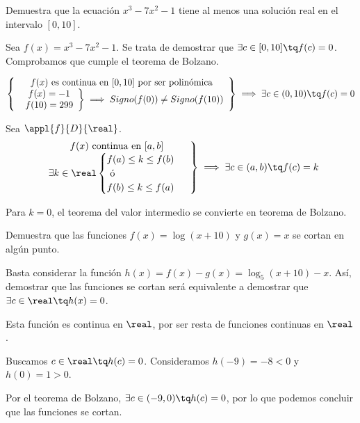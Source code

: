 \begin{problem} Demuestra que la ecuación $x^3-7x^2-1$ tiene al menos una solución real en el intervalo $[0,10]$.
\solution

Sea $f(x) = x^3-7x^2-1$. Se trata de demostrar que $\exists c\in[0,10]\tq f(c) = 0$. Comprobamos que cumple el teorema de Bolzano.

\[
\left\{
	\begin{array}{c}
		f(x) \text{ es continua en } [0,10] \text{ por ser polinómica}\\
		\left.\begin{array}{c}
		f(x) = -1 \\
		f(10) = 299\end{array}
		\right\}\implies Signo(f(0))\neq Signo(f(10))
	\end{array}
\right\}\implies \exists c\in(0,10)\tq f(c)=0 
\]
\end{problem}

\begin{theorem}
Sea $\appl{f}{D}{\real}$.
\[
\left.\begin{array}{c}f(x) \text{ continua en } [a,b]\\
\exists k\in\real \begin{cases}f(a)\leq k\leq f(b)\\ \text{           ó} \\f(b)\leq k \leq f(a)\end{cases}\end{array}\right\}\implies \exists c\in(a,b) \tq f(c) = k
\]
\end{theorem}

\obs Para $k=0$, el teorema del valor intermedio se convierte en teorema de Bolzano.


\begin{problem}
Demuestra que las funciones $f(x) = \log(x+10)$ y $g(x) = x$ se cortan en algún punto.
\solution

Basta considerar la función $h(x) = f(x) - g(x) = \log_5(x+10)-x$. Así, demostrar que las funciones se cortan será equivalente a demostrar que $\exists c\in\real\tq h(x)=0$. 

Esta función es continua en $\real$, por ser resta de funciones continuas en $\real$.

Buscamos $c\in\real\tq h(c)=0$. Consideramos $h(-9) = -8<0$ y $h(0)= 1 >0$.

Por el teorema de Bolzano, $\exists c\in (-9,0)\tq h(c) = 0$, por lo que podemos concluir que las funciones se cortan.
\end{problem}


